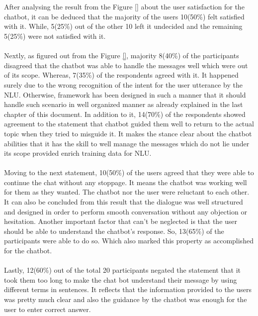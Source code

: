 \\~\\
After analysing the result from the Figure \ref{} about the user satisfaction for the chatbot, it can be deduced that the majority of the users 10(50\%) felt satisfied with it. While, 5(25\%) out of the other 10 left it undecided and the remaining 5(25\%) were not satisfied with it.
\\~\\
Nextly, as figured out from the Figure \ref{}, majority 8(40\%) of the participants disagreed that the chatbot was able to handle the messages well which were out of its scope. Whereas, 7(35\%) of the respondents agreed with it. It happened surely due to the wrong recognition of the intent for the user utterance by the NLU. Otherwise, framework has been designed in such a manner that it should handle such scenario in well organized manner as already explained in the last chapter of this document. In addition to it, 14(70\%) of the respondents showed agreement to the statement that chatbot guided them well to return to the actual topic when they tried to misguide it. It makes the stance clear about the chatbot abilities that it has the skill to well manage the messages which do not lie under its scope provided enrich training data for NLU.
\\~\\
Moving to the next statement, 10(50\%) of the users agreed that they were able to continue the chat without any stoppage. It means the chatbot was working well for them as they wanted. The chatbot nor the user were reluctant to each other. It can also be concluded from this result that the dialogue was well structured and designed in order to perform smooth conversation without any objection or hesitation. Another important factor that can't be neglected is that the user should be able to understand the chatbot's response. So, 13(65\%) of the participants were able to do so. Which also marked this property as accomplished for the chatbot.
\\~\\
Lastly, 12(60\%) out of the total 20 participants negated the statement that it took them too long to make the chat bot understand their message by using different terms in sentences. It reflects that the information provided to the users was pretty much clear and also the guidance by the chatbot was enough for the user to enter correct answer.

